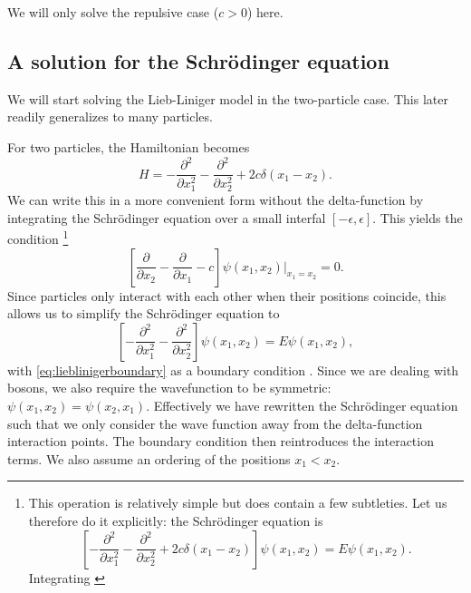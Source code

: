 \documentclass[11pt, a4paper]{report} %
\begin{document}
We will only solve the repulsive case (\(c > 0\)) here.

\subsection{A solution for the Schrödinger equation}

We will start solving the Lieb-Liniger model in the two-particle case. This later readily generalizes to many particles.

For two particles, the Hamiltonian becomes
\begin{equation}
	H =  - \frac{\partial^2}{\partial x_1^2} - \frac{\partial^2}{\partial x_2^2} + 2c \delta(x_1 - x_2).
\end{equation}
We can write this in a more convenient form without the delta-function by integrating the Schrödinger equation over a small interfal \([-\epsilon,\epsilon]\).
This yields the condition \cite{Lieb1963}\footnote{This operation is relatively simple but does contain a few subtleties. Let us therefore do it explicitly:
the Schrödinger equation is
\begin{equation}
	\left[- \frac{\partial^2}{\partial x_1^2} - \frac{\partial^2}{\partial x_2^2} + 2c \delta(x_1 - x_2)\right] \psi(x_1, x_2) = E \psi(x_1,x_2).
\end{equation} 
Integrating \cite{Griffiths1993}
}
\begin{equation}\label{eq:lieblinigerboundary}
	\left[\frac{\partial}{\partial x_2} - \frac{\partial}{\partial x_1} - c\right] \psi(x_1, x_2)\bigg\rvert_{x_1 = x_2} = 0.
\end{equation}
Since particles only interact with each other when their positions coincide, this allows us to simplify the Schrödinger equation to
\begin{equation}\label{eq:lieblinigersimple}
	\left[- \frac{\partial^2}{\partial x_1^2} - \frac{\partial^2}{\partial x_2^2}\right] \psi(x_1, x_2) = E \psi(x_1,x_2),
\end{equation}
with \cref{eq:lieblinigerboundary} as a boundary condition \cite{Lieb1963}.
Since we are dealing with bosons, we also require the wavefunction to be symmetric: \(\psi(x_1,x_2) = \psi(x_2,x_1)\).
Effectively we have rewritten the Schrödinger equation such that we only consider the wave function away from the delta-function interaction points.
The boundary condition then reintroduces the interaction terms.
We also assume an ordering of the positions \(x_1 < x_2\).
\end{document}
